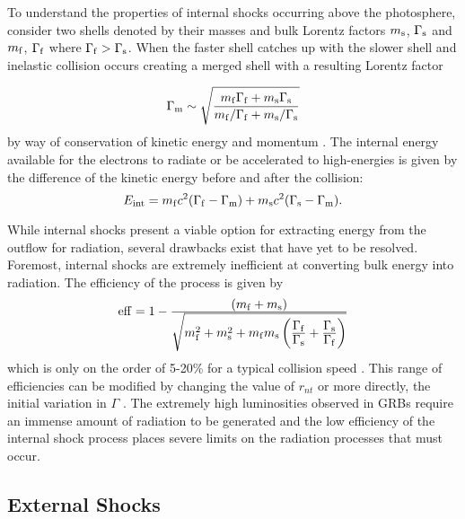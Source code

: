 To understand the properties of internal shocks occurring above the
photosphere, consider two shells denoted by their masses and bulk
Lorentz factors $m_{\rm s}$, $\Gamma_{\rm s}$ and $m_{\rm f}$,
$\Gamma_{\rm f}$ where $\Gamma_{\rm f} > \Gamma_{\rm s}$. When the
faster shell catches up with the slower shell and inelastic collision
occurs creating a merged shell with a resulting Lorentz factor

\begin{equation}
\label{eq:intshock}
\Gamma_{\rm m} \sim \sqrt{\frac{m_{\rm f} \Gamma_{\rm f} + m_{\rm s} \Gamma_{\rm s}}{{m_{\rm f} /\Gamma_{\rm f}}+m_{\rm s}/ \Gamma_{\rm s}}}
\end{equation}
by way of conservation of kinetic energy and momentum
\cite{Daigne:1998}. The internal energy available for the electrons to
radiate or be accelerated to high-energies is given by the difference
of the kinetic energy before and after the collision:
\begin{equation}
  \label{eq:intEne}
  E_{\rm int}=m_{\rm f} c^2 (\Gamma_{\rm f}-\Gamma_{\rm m})+m_{\rm s}c^2(\Gamma_{\rm s}-\Gamma_{\rm m}).
\end{equation}

While internal shocks present a viable option for extracting energy
from the outflow for radiation, several drawbacks exist that have
yet to be resolved. Foremost, internal shocks are extremely
inefficient at converting bulk energy into radiation. The efficiency
of the process is given by
\begin{equation}
  \label{eq:eff}
  {\rm eff} = 1 - \dover{(m_{\rm f} + m_{\rm s})}{\sqrt{m_{\rm f}^2+m_{\rm s}^2 +m_{\rm f}m_{\rm s}\left( \dover{\Gamma_{\rm f}}{\Gamma_{\rm s}} +  \dover{\Gamma_{\rm s}}{\Gamma_{\rm f}}   \right)}}
\end{equation}
which is only on the order of 5-20\% for a typical collision speed
\cite{Daigne:1998,Guetta:2001}. This range of efficiencies can be
modified by changing the value of $r_{nt}$ or more directly, the
initial variation in $\Gamma$ \cite{Spada:2000,Beloborodov:2003}.  The
extremely high luminosities observed in GRBs require an immense amount
of radiation to be generated and the low efficiency of the internal
shock process places severe limits on the radiation processes that
must occur.

\subsection{External Shocks}



